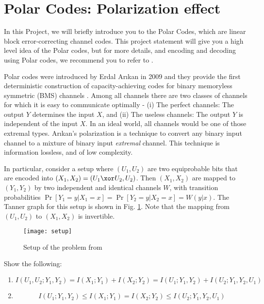 \documentclass[a4paper,11pt]{article}
\begin{document}

\section{Polar Codes: Polarization effect}

In this Project, we will briefly introduce you to the Polar Codes, which are linear block error-correcting channel codes. This project statement will give you a high level idea of the Polar codes, but for more details, and encoding and decoding using Polar codes, we recommend you to refer to \cite{arikan,Pfister}.

Polar codes were introduced by Erdal Arıkan in 2009 and they provide the first deterministic construction of capacity-achieving codes for binary memoryless symmetric (BMS) channels \cite{arikan}. Among all channels there are two classes of channels for which it is easy to communicate optimally - (i) The perfect channels: The output $Y$ determines the input $X$, and (ii) The useless channels: The output $Y$ is independent of the input $X$. In an ideal world, all channels would be one of those extremal types. Arıkan's polarization is a technique to convert any binary input channel to a mixture of binary input \textit{extremal} channel. This technique is information lossless, and of low complexity.

In particular, consider a setup where $(U_1,U_2)$ are two equiprobable bits that are encoded into $(X_1,X_2) = (U_1 \xor U_2, U_2)$. Then $(X_1,X_2)$ are mapped to $(Y_1,Y_2)$ by two independent and identical channels $W$, with transition probabilities $\Pr[Y_1 = y \big\vert X_1 = x] = \Pr[Y_2 = y \big\vert X_2 = x] = W(y \big\vert x)$. The Tanner graph for this setup is shown in Fig. \ref{fig:setup}. Note that the mapping from $(U_1,U_2)$ to $(X_1,X_2)$ is invertible.

\begin{figure}[H]
\centering
\texttt{[image: setup]}
\caption{Setup of the problem from \cite{Pfister}}
\label{fig:setup}
\end{figure}

{\color{blue}
\exercise[polarization]
Show the following:
\begin{enumerate}
\item
\begin{equation}
I(U_1,U_2;Y_1,Y_2) = I(X_1;Y_1) + I(X_2; Y_2) = I(U_1;Y_1,Y_2) + I(U_2;Y_1,Y_2,U_1)
\label{eqn:polarization1}
\end{equation}

\item
\begin{equation}
I(U_1;Y_1,Y_2) \leq I(X_1;Y_1) = I(X_2; Y_2) \leq I(U_2;Y_1,Y_2,U_1)
\label{eqn:polarization2}
\end{equation}
\end{enumerate}
}
\end{document}
